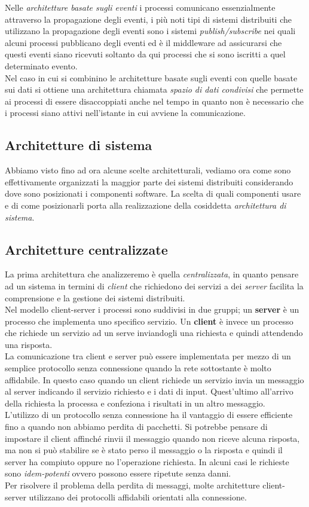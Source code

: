 Nelle \emph{architetture basate sugli eventi} i processi comunicano essenzialmente attraverso la propagazione degli eventi, i più noti tipi di sistemi distribuiti che utilizzano la propagazione degli eventi sono i sistemi \emph{publish/subscribe} nei quali alcuni processi pubblicano degli eventi ed è il middleware ad assicurarsi che questi eventi siano ricevuti soltanto da qui processi che si sono iscritti a quel determinato evento.\\
Nel caso in cui si combinino le architetture basate sugli eventi con quelle basate sui dati si ottiene una architettura chiamata \emph{spazio di dati condivisi} che permette ai processi di essere disaccoppiati anche nel tempo in quanto non è necessario che i processi siano attivi nell'istante in cui avviene la comunicazione.
\subsection{Architetture di sistema}
Abbiamo visto fino ad ora alcune scelte architetturali, vediamo ora come sono effettivamente organizzati la maggior parte dei sistemi distribuiti considerando dove sono posizionati i componenti software. La scelta di quali componenti usare e di come posizionarli porta alla realizzazione della cosiddetta \emph{architettura di sistema}.
\subsection{Architetture centralizzate}
La prima architettura che analizzeremo è quella \emph{centralizzata}, in quanto pensare ad un sistema in termini di \emph{client} che richiedono dei servizi a dei \emph{server} facilita la comprensione e la gestione dei sistemi distribuiti.\\
Nel modello client-server i processi sono suddivisi in due gruppi; un \textbf{server} è un processo che implementa uno specifico servizio. Un \textbf{client} è invece un processo che richiede un servizio ad un serve inviandogli una richiesta e quindi attendendo una risposta.\\
La comunicazione tra client e server può essere implementata per mezzo di un semplice protocollo senza connessione quando la rete sottostante è molto affidabile. In questo caso quando un client richiede un servizio invia un messaggio al server indicando il servizio richiesto e i dati di input. Quest'ultimo all'arrivo della richiesta la processa e confeziona i risultati in un altro messaggio.\\
L'utilizzo di un protocollo senza connessione ha il vantaggio di essere efficiente fino a quando non abbiamo perdita di pacchetti. Si potrebbe pensare di impostare il client affinché rinvii il messaggio quando non riceve alcuna risposta, ma non si può stabilire se è stato perso il messaggio o la risposta e quindi il server ha compiuto oppure no l'operazione richiesta. In alcuni casi le richieste sono \emph{idem-potenti} ovvero possono essere ripetute senza danni.\\
Per risolvere il problema della perdita di messaggi, molte architetture client-server utilizzano dei protocolli affidabili orientati alla connessione.
